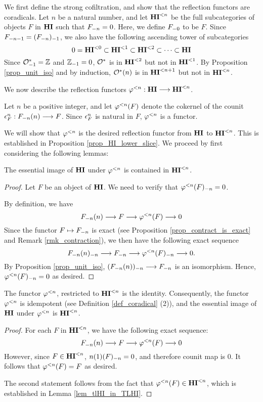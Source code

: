 We first define the strong cofiltration, and show that the 
reflection functors are coradicals. Let $n$ be a natural number, 
and let $\TLHI{n}{\HI}$ be the full subcategories of objects $F$ 
in $\HI$ such that $\RHI[n]{F} = 0$. Here, we define $\RHI[0]{F}$
to be $F$. Since $\RHI[n - 1]{F} = \RHI{(\RHI[n]{F})}$, we also 
have the following ascending tower of subcategories
\[
0 = \TLHI{0}{\HI} \subset \TLHI{1}{\HI} \subset \TLHI{2}{\HI} 
   \subset \cdots \subset \HI
\]
Since $\RHI{\Ox} = \Z$ and $\RHI{\Z} = 0$, $\Ox$ is in 
$\TLHI{2}{\HI}$ but not in $\TLHI{1}{\HI}$. By Proposition 
\ref{prop_unit_iso} and by induction, $\LHI[n]{\Ox}$ is in 
$\TLHI{n + 1}{\HI}$ but not in $\TLHI{n}{\HI}$.

We now describe the reflection functors $\tlHI{n} : \HI \to 
\TLHI{n}{\HI}$. 

\begin{defn}
Let $n$ be a positive integer, and let $\tlHI{n}(F)$ denote the 
cokernel of the counit $\cuHI^n_F: \LHI[n]{\RHI[n]{F}} \to F$. 
Since $\cuHI^n_F$ is natural in $F$, $\tlHI{n}$ is a functor.
\end{defn}

We will show that $\tlHI{n}$ is the desired reflection functor
from $\HI$ to $\TFHI{n}$. This is established in Proposition
\ref{prop_HI_lower_slice}. We proceed by first considering the
following lemmas:

\begin{lem}\label{lem_tlHI_in_TLHI}
The essential image of $\HI$ under $\tlHI{n}$ is contained in 
$\TLHI{n}{\HI}$.
\end{lem}

\begin{proof}
Let $F$ be an object of $\HI$. We need to verify that 
$\RHI[n]{\tlHI{n}(F)} = 0$.

By definition, we have
\[
\LHI[n]{\RHI[n]{F}} \to F \to \tlHI{n}(F) \to 0
\]
Since the functor $F \mapsto \RHI[n]{F}$ is exact (see Proposition
\ref{prop_contract_is_exact} and Remark \ref{rmk_contraction}), we 
then have the following exact sequence
\[
\RHI[n]{\LHI[n]{\RHI[n]{F}}} \to \RHI[n]{F} \to
\RHI[n]{\tlHI{n}(F)} \to 0.
\]
By Proposition \ref{prop_unit_iso}, $\RHI[n]{(\LHI[n]{\RHI[n]{F}})}
\to \RHI[n]{F}$ is an isomorphism. Hence,
$\RHI[n]{\tlHI{n}(F)} = 0$ as desired.
\end{proof}

\begin{lem}\label{lem_tlHI_id}
The functor $\tlHI{n}$, restricted to $\TFHI{n}$ is the 
identity. Consequently, the functor $\tlHI{n}$ is idempotent
(see Definition \ref{def_coradical} (2)), and the essential
image of $\HI$ under $\tlHI{n}$ is $\TFHI{n}$.
\end{lem}
\begin{proof}
For each $F$ in $\TFHI{n}$, we have the following exact sequence:
\[
\LHI[n]{\RHI[n]{F}} \to F \to \tlHI{n}(F) \to 0
\]
However, since $F \in \TFHI{n}$, $\RHI[n]{\LHI{n}(F)} = 0$, 
and therefore counit map is $0$. It follows that $\tlHI{n}(F) = F$ 
as desired.

The second statement follows from the fact that $\tlHI{n}(F) \in 
\TLHI{n}{\HI}$, which is established in Lemma 
\ref{lem_tlHI_in_TLHI}.
\end{proof}

